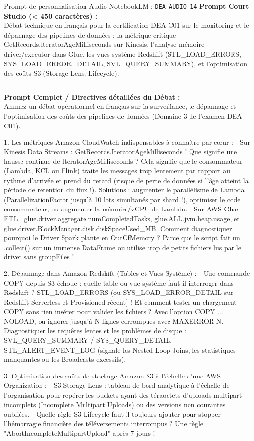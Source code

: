 \documentclass[11pt,a4paper]{article}
\begin{document}
\begin{promptbox}{Prompt de personnalisation Audio NotebookLM : \texttt{DEA-AUDIO-14}}
\textbf{Prompt Court Studio (< 450 caractères) :}\\
Débat technique en français pour la certification DEA-C01 sur le monitoring et le dépannage des pipelines de données : la métrique critique GetRecords.IteratorAgeMilliseconds sur Kinesis, l'analyse mémoire driver/executor dans Glue, les vues système Redshift (STL\_LOAD\_ERRORS, SYS\_LOAD\_ERROR\_DETAIL, SVL\_QUERY\_SUMMARY), et l'optimisation des coûts S3 (Storage Lens, Lifecycle).

\medskip\hrule\medskip
\textbf{Prompt Complet / Directives détaillées du Débat :}\\
Animez un débat opérationnel en français sur la surveillance, le dépannage et l'optimisation des coûts des pipelines de données (Domaine 3 de l'examen DEA-C01).

1. Les métriques Amazon CloudWatch indispensables à connaître par cœur :
- Sur Kinesis Data Streams : GetRecords.IteratorAgeMilliseconds ! Que signifie une hausse continue de IteratorAgeMilliseconds ? Cela signifie que le consommateur (Lambda, KCL ou Flink) traite les messages trop lentement par rapport au rythme d'arrivée et prend du retard (risque de perte de données si l'âge atteint la période de rétention du flux !). Solutions : augmenter le parallélisme de Lambda (ParallelizationFactor jusqu'à 10 lots simultanés par shard !), optimiser le code consommateur, ou augmenter la mémoire/vCPU de Lambda.
- Sur AWS Glue ETL : glue.driver.aggregate.numCompletedTasks, glue.ALL.jvm.heap.usage, et glue.driver.BlockManager.disk.diskSpaceUsed\_MB. Comment diagnostiquer pourquoi le Driver Spark plante en OutOfMemory ? Parce que le script fait un .collect() sur un immense DataFrame ou utilise trop de petits fichiers lus par le driver sans groupFiles !

2. Dépannage dans Amazon Redshift (Tables et Vues Système) :
- Une commande COPY depuis S3 échoue : quelle table ou vue système faut-il interroger dans Redshift ? STL\_LOAD\_ERRORS (ou SYS\_LOAD\_ERROR\_DETAIL sur Redshift Serverless et Provisioned récent) ! Et comment tester un chargement COPY sans rien insérer pour valider les fichiers ? Avec l'option COPY ... NOLOAD, ou ignorer jusqu'à N lignes corrompues avec MAXERROR N.
- Diagnostiquer les requêtes lentes et les problèmes de disque : SVL\_QUERY\_SUMMARY / SYS\_QUERY\_DETAIL, STL\_ALERT\_EVENT\_LOG (signale les Nested Loop Joins, les statistiques manquantes ou les Broadcasts excessifs).

3. Optimisation des coûts de stockage Amazon S3 à l'échelle d'une AWS Organization :
- S3 Storage Lens : tableau de bord analytique à l'échelle de l'organisation pour repérer les buckets ayant des téraoctets d'uploads multipart incomplets (Incomplete Multipart Uploads) ou des versions non courantes oubliées.
- Quelle règle S3 Lifecycle faut-il toujours ajouter pour stopper l'hémorragie financière des téléversements interrompus ? Une règle "AbortIncompleteMultipartUpload" après 7 jours !
\end{promptbox}
\end{document}
